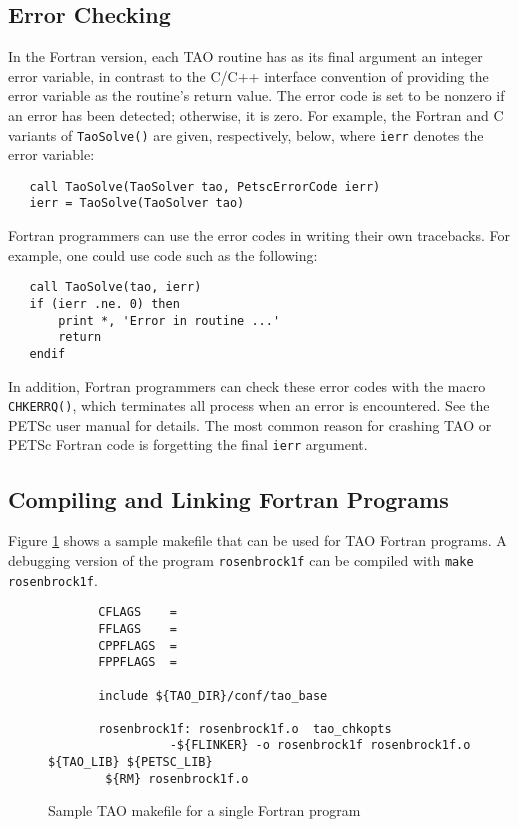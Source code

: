 \subsection{Error Checking}
\label{sec:fortran_errors}

In the Fortran version, each TAO routine has as its final argument
an integer error variable, in contrast to the C/C++ interface convention 
of providing the error variable as the routine's return value.  The error
code is set to be nonzero if an error has been detected; otherwise, it
is zero.  For example, the Fortran and C variants of {\tt TaoSolve()} are
given, respectively, below, where {\tt ierr} denotes the error variable:
\begin{verbatim}
   call TaoSolve(TaoSolver tao, PetscErrorCode ierr)
   ierr = TaoSolve(TaoSolver tao)
\end{verbatim}
\noindent

Fortran programmers can use the error codes in writing their own
tracebacks.  For example, one could use code such as the following:
\begin{verbatim}
   call TaoSolve(tao, ierr)
   if (ierr .ne. 0) then
       print *, 'Error in routine ...'
       return
   endif
\end{verbatim}
\noindent
In addition, Fortran programmers can check these error codes with the
macro {\tt CHKERRQ()}, which terminates all process when an error
is encountered.  See the PETSc user manual for details.  The most
common reason for crashing TAO or PETSc Fortran code is forgetting 
the final {\tt ierr} argument.

\subsection{Compiling and Linking Fortran Programs}
\label{sec:fortcompile}

Figure \ref{fig:make4} shows a sample makefile that can be used for
TAO Fortran programs.  A debugging version of the program 
{\tt rosenbrock1f} can be compiled with {\tt make rosenbrock1f}.

\begin{figure}[tbh]
{\footnotesize
\begin{verbatim}   
       CFLAGS    = 
       FFLAGS    = 
       CPPFLAGS  =
       FPPFLAGS  =
       
       include ${TAO_DIR}/conf/tao_base
   
       rosenbrock1f: rosenbrock1f.o  tao_chkopts
                 -${FLINKER} -o rosenbrock1f rosenbrock1f.o ${TAO_LIB} ${PETSC_LIB}
        ${RM} rosenbrock1f.o
\end{verbatim} %
\noindent
}
\caption{Sample TAO makefile for a single Fortran program}
\label{fig:make4}
\end{figure}

